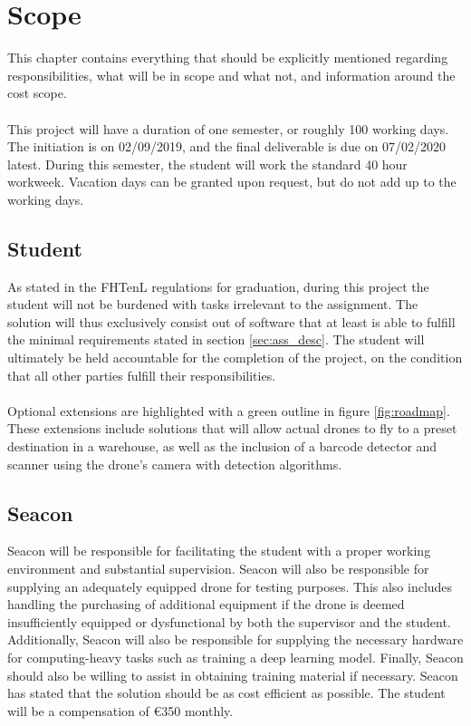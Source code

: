\chapter{Scope}
\label{ch:scope}

This chapter contains everything that should be explicitly mentioned regarding responsibilities, what will be in scope and what not, and information around the cost scope. \\\\
\noindent
This project will have a duration of one semester, or roughly 100 working days. The initiation is on 02/09/2019, and the final deliverable is due on 07/02/2020 latest. During this semester, the student will work the standard 40 hour workweek. Vacation days can be granted upon request, but do not add up to the working days.

\section{Student}
As stated in the \gls{FHTenL} regulations for graduation, during this project the student will not be burdened with tasks irrelevant to the assignment. The solution will thus exclusively consist out of software that at least is able to fulfill the minimal requirements stated in section \ref{sec:ass_desc}. The student will ultimately be held accountable for the completion of the project, on the condition that all other parties fulfill their responsibilities. \\\\
\noindent
Optional extensions are highlighted with a green outline in figure \ref{fig:roadmap}. These extensions include solutions that will allow actual drones to fly to a preset destination in a warehouse, as well as the inclusion of a barcode detector and scanner using the drone's camera with detection algorithms. 

\section{Seacon}
Seacon will be responsible for facilitating the student with a proper working environment and substantial supervision. Seacon will also be responsible for supplying an adequately equipped drone for testing purposes. This also includes handling the purchasing of additional equipment if the drone is deemed insufficiently equipped or dysfunctional by both the supervisor and the student. Additionally, Seacon will also be responsible for supplying the necessary hardware for computing-heavy tasks such as training a \gls{deep learning} model. Finally, Seacon should also be willing to assist in obtaining training material if necessary. Seacon has stated that the solution should be as cost efficient as possible. The student will be a compensation of \euro350 monthly.

